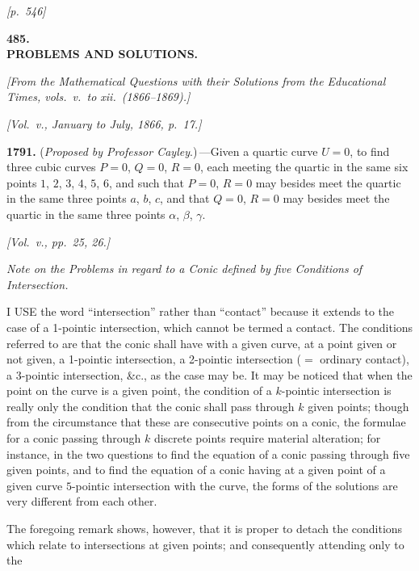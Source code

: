 \documentclass[11pt]{article}
\begin{document}
\newpage
\noindent\textit{[p.~546]}

\bigskip

\begin{center}
\textbf{\large 485.}\\[6pt]
\textbf{\Large PROBLEMS AND SOLUTIONS.}
\end{center}

\medskip

\noindent\textit{[From the Mathematical Questions with their Solutions
from the Educational Times, vols.~v.\ to xii.\ (1866--1869).]}

\medskip

\begin{center}
\textit{[Vol.~v., January to July, 1866, p.~17.]}
\end{center}

\medskip

\textbf{1791.} (\textit{Proposed by Professor Cayley}.)\,---Given a
quartic curve $U=0$, to find three cubic curves $P=0$, $Q=0$, $R=0$,
each meeting the quartic in the same six points $1$, $2$, $3$, $4$, $5$,
$6$, and such that $P=0$, $R=0$ may besides meet the quartic in the same
three points $a$, $b$, $c$, and that $Q=0$, $R=0$ may besides meet the
quartic in the same three points $\alpha$, $\beta$, $\gamma$.

\medskip

\begin{center}
\textit{[Vol.~v., pp.~25, 26.]}
\end{center}

\medskip

\textit{Note on the Problems in regard to a Conic defined by five
Conditions of Intersection.}

\medskip

I USE the word ``intersection'' rather than ``contact'' because it
extends to the case of a 1-pointic intersection, which cannot be termed
a contact. The conditions referred to are that the conic shall have
with a given curve, at a point given or not given, a 1-pointic
intersection, a 2-pointic intersection ($=$ ordinary contact), a
3-pointic intersection, \&c., as the case may be. It may be noticed
that when the point on the curve is a given point, the condition of a
$k$-pointic intersection is really only the condition that the conic
shall pass through $k$ given points; though from the circumstance that
these are consecutive points on a conic, the formulae for a conic
passing through $k$ discrete points require material alteration; for
instance, in the two questions to find the equation of a conic passing
through five given points, and to find the equation of a conic having
at a given point of a given curve $5$-pointic intersection with the
curve, the forms of the solutions are very different from each other.

\medskip

The foregoing remark shows, however, that it is proper to detach the
conditions which relate to intersections at given points; and
consequently attending only to the
\end{document}
